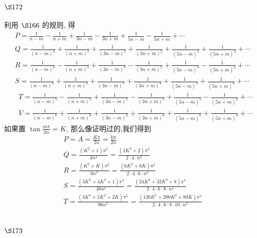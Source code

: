 \section{$\S 172$}

利用 $\S 166$ 的规则, 得
\[
\begin{gathered}
P=\frac{1}{n-m}-\frac{1}{n+m}+\frac{1}{3 n-m}-\frac{1}{3 n+m}+\frac{1}{5 n-m}-\frac{1}{5 n+m}+\cdots \\
Q=\frac{1}{(n-m)^{2}}+\frac{1}{(n+m)^{2}}+\frac{1}{(3 n-m)^{2}}+\frac{1}{(3 n+m)^{2}}+\frac{1}{(5 n-m)^{2}}+\frac{1}{(5 n+m)^{2}}+\cdots \\
R=\frac{1}{(n-m)^{3}}-\frac{1}{(n+m)^{3}}+\frac{1}{(3 n-m)^{3}}-\frac{1}{(3 n+m)^{2}}+\frac{1}{(5 n-m)^{3}}-\frac{1}{(5 n+m)^{2}}+\cdots \\
S=\frac{1}{(n-m)^{4}}+\frac{1}{(n+m)^{4}}+\frac{1}{(3 n-m)^{4}}+\frac{1}{(3 n+m)^{4}}+\frac{1}{(5 n-m)^{4}}+\frac{1}{(5 n+m)^{4}}+\cdots
\end{gathered}
\]
\[
\begin{aligned}
& T=\frac{1}{(n-m)^{5}}-\frac{1}{(n+m)^{5}}+\frac{1}{(3 n-m)^{5}}-\frac{1}{(3 n+m)^{5}}+\frac{1}{(5 n-m)^{5}}-\frac{1}{(5 n+m)^{2}}+\cdots \\
& V=\frac{1}{(n-m)^{6}}+\frac{1}{(n+m)^{6}}+\frac{1}{(3 n-m)^{6}}+\frac{1}{(3 n+m)^{6}}+\frac{1}{(5 n-m)^{6}}+\frac{1}{(5 n+m)^{6}}+\cdots
\end{aligned}
\]
如果置 $\tan \frac{m \pi}{2 n}=K$, 那么像证明过的,我们得到
\[
\begin{gathered}
P=A=\frac{K \pi}{2 n}=\frac{k \pi}{2 n} \\
Q=\frac{\left(K^{2}+1\right) \pi^{2}}{4 n^{2}}=\frac{\left(2 K^{2}+2\right) \pi^{2}}{2 \cdot 4 \cdot n^{2}} \\
R=\frac{\left(K^{3}+K\right) \pi^{3}}{8 n^{3}}=\frac{\left(6 K^{3}+6 K\right) \pi^{3}}{2 \cdot 4 \cdot 6 \cdot n^{3}} \\
S=\frac{\left(3 K^{4}+4 K^{2}+1\right) \pi^{4}}{48 n^{4}}=\frac{\left(24 K^{4}+32 K^{3}+8\right) \pi^{4}}{2 \cdot 4 \cdot 6 \cdot 8 \cdot n^{4}} \\
T=\frac{\left(3 K^{5}+5 K^{3}+2 K\right) \pi^{5}}{96 n^{5}}=\frac{\left(120 K^{5}+200 K^{3}+80 K\right) \pi^{5}}{2 \cdot 4 \cdot 6 \cdot 8 \cdot 10 \cdot n^{5}}
\end{gathered}
\]
\section{$\S 173$}

